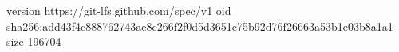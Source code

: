 version https://git-lfs.github.com/spec/v1
oid sha256:add43f4c888762743ae8c266f2f0d5d3651c75b92d76f26663a53b1e03b8a1a1
size 196704
